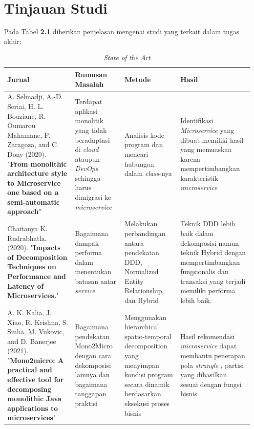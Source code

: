 \section{Tinjauan Studi}
\par Pada Tabel \textbf{2.1} diberikan penjelasan mengenai studi yang terkait dalam tugas akhir:

\begingroup
\setlength{\LTleft}{-20cm plus -1fill}
\setlength{\LTright}{\LTleft}
\begin{small}
	\begin{longtable}{|p{3cm}|p{3.5cm}|p{3cm}|p{3.5cm}|}
		\caption{\textit{State of the Art}}\\
		\hline
		\textbf{Jurnal} & \textbf{Rumusan Masalah} & \textbf{Metode} & \textbf{Hasil}\\
		\endfirsthead

		\hline
		A. Selmadji, A.-D. Seriai, H. L. Bouziane, R. Oumarou Mahamane, P. Zaragoza, and C. Dony   (2020). "\textbf{From monolithic architecture style to Microservice one based on a semi-automatic approach}" \cite{5B1} &
		Terdapat aplikasi monolitik yang tidak beradaptasi di \textit{cloud} ataupun \textit{DevOps} sehingga harus dimigrasi ke \textit{microservice} &
		Analisis kode program dan mencari hubungan dalam \textit{class}-nya  &
		Identifikasi \textit{Microservice} yang dibuat memiliki hasil yang memuaskan karena mempertimbangkan karakteristik \textit{microservice}
		\\

		\hline
		Chaitanya K. Rudrabhatla. (2020). "\textbf{Impacts of Decomposition Techniques on Performance and Latency of Microservices.}"  \cite{6C1} &
		Bagaimana dampak performa dalam menentukan batasan antar \textit{service}  &
		Melakukan perbandingan antara pendekatan DDD, Normalized Entity Relationship, dan Hybrid &
		Teknik DDD lebih baik dalam dekomposisi namun teknik Hybrid dengan mempertimbangkan fungsionalis dan transaksi yang terjadi memiliki performa lebih baik.
		\\

		\hline
		A. K. Kalia, J. Xiao, R. Krishna, S. Sinha, M. Vukovic, and D. Banerjee (2021). "\textbf{Mono2micro: A practical and effective tool for decomposing monolithic Java applications to microservices}" \cite{8EA} &
		Bagaimana pendekatan Mono2Micro dengan cara dekomposisi lainnya dan bagaimana tanggapan praktisi&
		Menggunakan hierarchical spatio-temporal decomposition  yang menyimpan kondisi program secara dinamik berdasarkan eksekusi proses bisnis  &
		Hasil rekomendasi \textit{microservice} dapat membantu penerapan pola \textit{strangle} , partisi yang dihasilkan sesuai dengan fungsi bisnis
		\\
		

\end{longtable}
\end{small}
